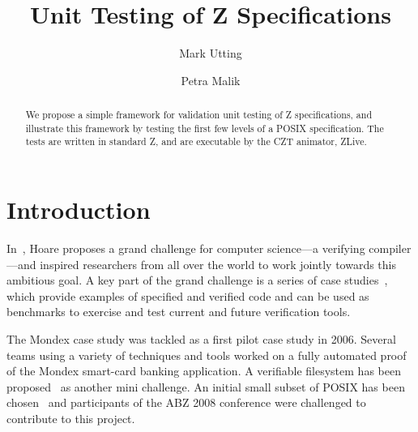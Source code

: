 \documentclass{llncs}
\begin{document}
\pagestyle{headings}  %
%
\title{Unit Testing of Z Specifications}
%
\author{Mark Utting \and Petra Malik}
%
%
%

\maketitle              %

\begin{abstract}
  We propose a simple framework for validation unit testing of Z
  specifications, and illustrate this framework by testing the first few
  levels of a POSIX specification.  The tests are written in standard Z,
  and are executable by the CZT animator, ZLive.
\end{abstract}

\section{Introduction}

In~\cite{Hoa03}, Hoare proposes a grand challenge for computer
science---a verifying compiler---and inspired researchers from all
over the world to work jointly towards this ambitious goal.
A key part of the grand challenge is a series of case
studies~\cite{BicHoaWoo06}, which
provide examples of specified and verified code and can
be used as benchmarks to exercise and test current and future
verification tools.

The Mondex case study was tackled as a first pilot case study in 2006.
Several teams using a variety of techniques and tools worked on
a fully automated proof of the Mondex smart-card banking application.
A verifiable filesystem has been proposed~\cite{JosHol07} as another
mini challenge.  An initial small subset of POSIX has been
chosen~\cite{FreFuWoo07} and participants of the ABZ 2008 conference
were challenged to contribute to this project.
\end{document}
